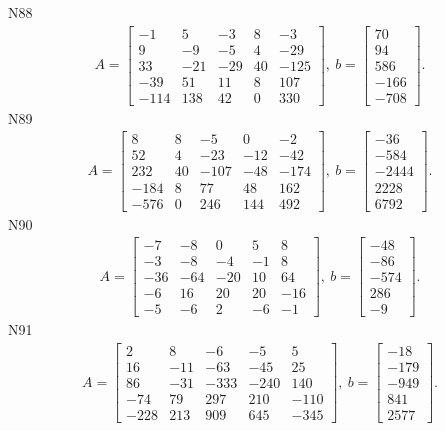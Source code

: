 \documentclass[11pt]{report}
\begin{document}
N88
\begin{align*}
 A = \left[\begin{matrix}-1 & 5 & -3 & 8 & -3\\9 & -9 & -5 & 4 & -29\\33 & -21 & -29 & 40 & -125\\-39 & 51 & 11 & 8 & 107\\-114 & 138 & 42 & 0 & 330\end{matrix}\right],
\ b = \left[\begin{matrix}70\\94\\586\\-166\\-708\end{matrix}\right]. 
 \end{align*}
N89
\begin{align*}
 A = \left[\begin{matrix}8 & 8 & -5 & 0 & -2\\52 & 4 & -23 & -12 & -42\\232 & 40 & -107 & -48 & -174\\-184 & 8 & 77 & 48 & 162\\-576 & 0 & 246 & 144 & 492\end{matrix}\right],
\ b = \left[\begin{matrix}-36\\-584\\-2444\\2228\\6792\end{matrix}\right]. 
 \end{align*}
N90
\begin{align*}
 A = \left[\begin{matrix}-7 & -8 & 0 & 5 & 8\\-3 & -8 & -4 & -1 & 8\\-36 & -64 & -20 & 10 & 64\\-6 & 16 & 20 & 20 & -16\\-5 & -6 & 2 & -6 & -1\end{matrix}\right],
\ b = \left[\begin{matrix}-48\\-86\\-574\\286\\-9\end{matrix}\right]. 
 \end{align*}
N91
\begin{align*}
 A = \left[\begin{matrix}2 & 8 & -6 & -5 & 5\\16 & -11 & -63 & -45 & 25\\86 & -31 & -333 & -240 & 140\\-74 & 79 & 297 & 210 & -110\\-228 & 213 & 909 & 645 & -345\end{matrix}\right],
\ b = \left[\begin{matrix}-18\\-179\\-949\\841\\2577\end{matrix}\right]. 
 \end{align*}
\end{document}
